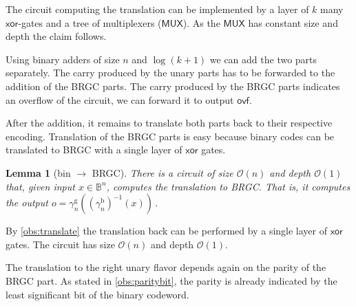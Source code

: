 \documentclass[9pt,journal,compsoc]{IEEEtran}
\newtheorem{lemma}[theorem]{Lemma}
\theoremstyle{remark}
\newcommand{\ovf}{\textsf{ovf}}
\newcommand{\IB}{\mathbb{B}}
\newcommand{\XOR}{\textsf{xor}}
\newcommand{\MUX}{\textsf{MUX}}
\newcommand{\gBin}[1]{\gamma_{#1}^{\operatorname{b}}}
\newcommand{\gBRGC}[1]{\gamma_{#1}^{\operatorname{g}}}
\newcommand{\BO}{\mathcal{O}}
\begin{document}
\begin{IEEEproof}
  The circuit computing the translation can be implemented by a layer
    of $k$ many $\XOR$-gates and a tree of multiplexers ($\MUX$).
  As the $\MUX$ has constant size and depth the claim follows.
\end{IEEEproof}

Using binary adders of size $n$ and $\log(k+1)$ we can add the two
  parts separately.
The carry produced by the unary parts has to be forwarded to the addition
  of the BRGC parts.
The carry produced by the BRGC parts indicates an overflow of the circuit,
  we can forward it to output $\ovf$.

After the addition, it remains to translate both parts back to their
  respective encoding.
Translation of the BRGC parts is easy because binary codes can be translated
  to BRGC with a single layer of $\XOR$ gates.

\begin{lemma}[bin $\rightarrow$ BRGC]\label{lem:bintobrgc}
  There is a circuit of size $\BO(n)$ and depth $\BO(1)$ that, given input $x\in\IB^n$,
    computes the translation to BRGC.
  That is, it computes the output
    $o = \gBRGC{n}((\gBin{n})^{-1}(x))\,.$
\end{lemma}
\begin{IEEEproof}
  By \cref{obs:translate} the translation back
    can be performed by a single layer of $\XOR$ gates.
  The circuit has size $\BO(n)$ and depth $\BO(1)$.
\end{IEEEproof}

The translation to the right unary flavor depends again on the parity
  of the BRGC part.
As stated in \cref{obs:paritybit}, the parity is already indicated by the
  least significant bit of the binary codeword.
\end{document}
